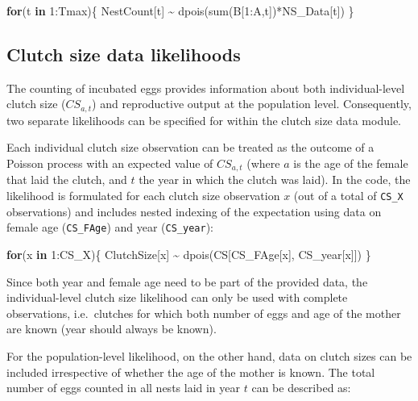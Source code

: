 \documentclass[
]{book}
\newenvironment{Shaded}{\begin{snugshade}}{\end{snugshade}}
\newcommand{\ControlFlowTok}[1]{\textcolor[rgb]{0.13,0.29,0.53}{\textbf{#1}}}
\newcommand{\DecValTok}[1]{\textcolor[rgb]{0.00,0.00,0.81}{#1}}
\newcommand{\FunctionTok}[1]{\textcolor[rgb]{0.00,0.00,0.00}{#1}}
\newcommand{\NormalTok}[1]{#1}
\newcommand{\SpecialCharTok}[1]{\textcolor[rgb]{0.00,0.00,0.00}{#1}}
\begin{document}
\begin{Shaded}
\begin{Highlighting}[]
\ControlFlowTok{for}\NormalTok{(t }\ControlFlowTok{in} \DecValTok{1}\SpecialCharTok{:}\NormalTok{Tmax)\{}
\NormalTok{  NestCount[t] }\SpecialCharTok{\textasciitilde{}} \FunctionTok{dpois}\NormalTok{(}\FunctionTok{sum}\NormalTok{(B[}\DecValTok{1}\SpecialCharTok{:}\NormalTok{A,t])}\SpecialCharTok{*}\NormalTok{NS\_Data[t])}
\NormalTok{\}}
\end{Highlighting}
\end{Shaded}

\hypertarget{clutch-size-data-likelihoods}{%
\subsection{Clutch size data likelihoods}\label{clutch-size-data-likelihoods}}

The counting of incubated eggs provides information about both individual-level
clutch size (\(CS_{a,t}\)) and reproductive output at the population level.
Consequently, two separate likelihoods can be specified for within the clutch
size data module.

Each individual clutch size observation can be treated as the outcome of a
Poisson process with an expected value of \(CS_{a,t}\) (where \(a\) is the age of
the female that laid the clutch, and \(t\) the year in which the clutch was laid).
In the code, the likelihood is formulated for each clutch size observation \(x\)
(out of a total of \texttt{CS\_X} observations) and includes nested indexing of the
expectation using data on female age (\texttt{CS\_FAge}) and year (\texttt{CS\_year}):

\begin{Shaded}
\begin{Highlighting}[]
\ControlFlowTok{for}\NormalTok{(x }\ControlFlowTok{in} \DecValTok{1}\SpecialCharTok{:}\NormalTok{CS\_X)\{}
\NormalTok{    ClutchSize[x] }\SpecialCharTok{\textasciitilde{}} \FunctionTok{dpois}\NormalTok{(CS[CS\_FAge[x], CS\_year[x]])}
\NormalTok{\}}
\end{Highlighting}
\end{Shaded}

Since both year and female age need to be part of the provided data, the
individual-level clutch size likelihood can only be used with complete
observations, i.e.~clutches for which both number of eggs and age of the mother
are known (year should always be known).

For the population-level likelihood, on the other hand, data on clutch sizes can
be included irrespective of whether the age of the mother is known. The total
number of eggs counted in all nests laid in year \(t\) can be described as:
\end{document}

